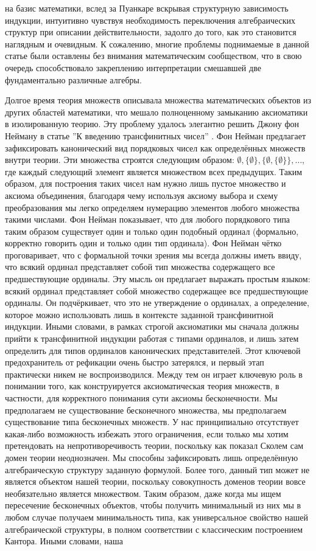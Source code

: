 \documentclass[12pt]{article}
\begin{document}
на базис математики, вслед за Пуанкаре вскрывая структурную зависимость индукции, интуитивно чувствуя необходимость переключения алгебраических структур при описании действительности, задолго до того, как это становится наглядным и очевидным.  К сожалению, многие проблемы поднимаемые в данной статье были оставлены без внимания математическим сообществом, что в свою очередь способствовало закреплению интерпретации смешавшей две фундаментально различные алгебры.

Долгое время теория множеств описывала множества математических объектов из других областей математики, что мешало полноценному замыканию аксиоматики в изолированную теорию. Эту проблему удалось элегантно решить Джону фон Нейману в статье ''К введению трансфинитных чисел'' \cite{von-neumann-ordinals}. Фон Нейман предлагает зафиксировать канонический вид порядковых чисел как определённых множеств внутри теории. Эти множества строятся следующим образом: $\emptyset, \{ \emptyset \}, \{ \emptyset, \{ \emptyset \} \}, \dots$, где каждый следующий элемент является множеством всех предыдущих. Таким образом, для построения таких чисел нам нужно лишь пустое множество и аксиома объединения, благодаря чему используя аксиому выбора и схему преобразования мы легко определяем нумерацию элементов любого множества такими числами. Фон Нейман показывает, что для любого порядкового типа таким образом существует один и только один подобный ординал (формально, корректно говорить один и только один тип ординала). Фон Нейман чётко проговаривает, что с формальной точки зрения мы всегда должны иметь ввиду, что всякий ординал представляет собой тип множества содержащего все предшествующие ординалы. Эту мысль он предлагает выражать простым языком: всякий ординал представляет собой множество содержащее все предшествующие ординалы. Он подчёркивает, что это не утверждение о ординалах, а определение, которое можно использовать лишь в контексте заданной трансфинитной индукции. Иными словами, в рамках строгой аксиоматики мы сначала должны прийти к трансфинитной индукции работая с типами ординалов, и лишь затем определить для типов ординалов канонических представителей. Этот ключевой предохранитель от рефикации очень быстро затерялся, и первый этап практически никем не воспроизводился. Между тем он играет ключевую роль в понимании того, как конструируется аксиоматическая теория множеств, в частности, для корректного понимания сути аксиомы бесконечности. Мы предполагаем не существование бесконечного множества, мы предполагаем существование типа бесконечных множеств. У нас принципиально отсутствует какая-либо возможность избежать этого ограничения, если только мы хотим претендовать на непротиворечивость теории, поскольку как показал Сколем сам домен теории неоднозначен. Мы способны зафиксировать лишь определённую алгебраическую структуру заданную формулой. Более того, данный тип может не является объектом нашей теории, поскольку совокупность доменов теории вовсе необязательно является множеством. Таким образом, даже когда мы ищем пересечение бесконечных объектов, чтобы получить минимальный из них мы в любом случае получаем минимальность типа, как универсальное свойство нашей алгебраической структуры, в полном соответствии с классическим построением Кантора. Иными словами, наша 
\end{document}
